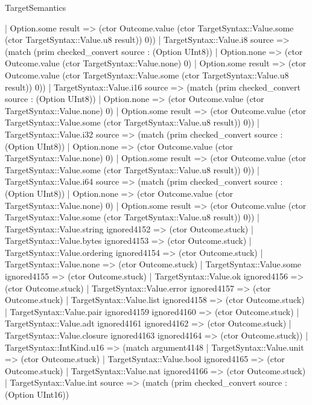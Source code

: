 \begin{lexlean}{TargetSemantics}
\begin{semanticmodule}
{              | Option.some result => (ctor Outcome.value (ctor TargetSyntax::Value.some (ctor TargetSyntax::Value.u8 result)) 0))
            | TargetSyntax::Value.i8 source => (match (prim checked_convert source : (Option UInt8))
              | Option.none => (ctor Outcome.value (ctor TargetSyntax::Value.none) 0)
              | Option.some result => (ctor Outcome.value (ctor TargetSyntax::Value.some (ctor TargetSyntax::Value.u8 result)) 0))
            | TargetSyntax::Value.i16 source => (match (prim checked_convert source : (Option UInt8))
              | Option.none => (ctor Outcome.value (ctor TargetSyntax::Value.none) 0)
              | Option.some result => (ctor Outcome.value (ctor TargetSyntax::Value.some (ctor TargetSyntax::Value.u8 result)) 0))
            | TargetSyntax::Value.i32 source => (match (prim checked_convert source : (Option UInt8))
              | Option.none => (ctor Outcome.value (ctor TargetSyntax::Value.none) 0)
              | Option.some result => (ctor Outcome.value (ctor TargetSyntax::Value.some (ctor TargetSyntax::Value.u8 result)) 0))
            | TargetSyntax::Value.i64 source => (match (prim checked_convert source : (Option UInt8))
              | Option.none => (ctor Outcome.value (ctor TargetSyntax::Value.none) 0)
              | Option.some result => (ctor Outcome.value (ctor TargetSyntax::Value.some (ctor TargetSyntax::Value.u8 result)) 0))
            | TargetSyntax::Value.string ignored4152 => (ctor Outcome.stuck)
            | TargetSyntax::Value.bytes ignored4153 => (ctor Outcome.stuck)
            | TargetSyntax::Value.ordering ignored4154 => (ctor Outcome.stuck)
            | TargetSyntax::Value.none => (ctor Outcome.stuck)
            | TargetSyntax::Value.some ignored4155 => (ctor Outcome.stuck)
            | TargetSyntax::Value.ok ignored4156 => (ctor Outcome.stuck)
            | TargetSyntax::Value.error ignored4157 => (ctor Outcome.stuck)
            | TargetSyntax::Value.list ignored4158 => (ctor Outcome.stuck)
            | TargetSyntax::Value.pair ignored4159 ignored4160 => (ctor Outcome.stuck)
            | TargetSyntax::Value.adt ignored4161 ignored4162 => (ctor Outcome.stuck)
            | TargetSyntax::Value.closure ignored4163 ignored4164 => (ctor Outcome.stuck))
          | TargetSyntax::IntKind.u16 => (match argument4148
            | TargetSyntax::Value.unit => (ctor Outcome.stuck)
            | TargetSyntax::Value.bool ignored4165 => (ctor Outcome.stuck)
            | TargetSyntax::Value.nat ignored4166 => (ctor Outcome.stuck)
            | TargetSyntax::Value.int source => (match (prim checked_convert source : (Option UInt16))
}
\end{semanticmodule}
\end{lexlean}
